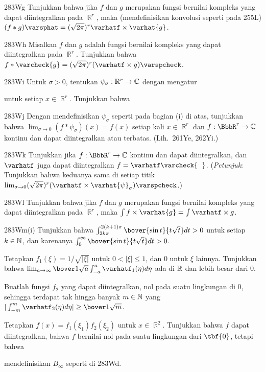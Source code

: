{\spheader 283Wg
Tunjukkan bahwa jika $f$ dan $g$ merupakan fungsi bernilai kompleks
yang dapat diintegralkan pada $\BbbR^r$, maka (mendefinisikan konvolusi seperti pada
255L) $(f*g)\varsphat=(\sqrt{2\pi})^r\varhatf\times\varhat{g}$.

\spheader 283Wh Misalkan $f$ dan $g$ adalah fungsi bernilai kompleks yang dapat
diintegralkan pada $\BbbR^r$. Tunjukkan bahwa
$f*\varcheck{g}=(\sqrt{2\pi})^r(\varhatf\times g)\varspcheck$.

\spheader 283Wi Untuk $\sigma>0$, tentukan
$\psi_{\sigma}:\Bbb R^r\to\Bbb C$ dengan mengatur


\noindent untuk setiap $x\in\BbbR^r$.   Tunjukkan bahwa


\spheader 283Wj Dengan mendefinisikan $\psi_{\sigma}$ seperti pada bagian (i) di atas, tunjukkan bahwa
$\lim_{\sigma\to 0}(f*\psi_{\sigma})(x)=f(x)$ setiap kali $x\in\BbbR^r$ dan
$f:\BbbR^r\to\Bbb C$ kontinu dan dapat diintegralkan atau terbatas.
(Lih.\ 261Ye, 262Yi.)

\spheader 283Wk Tunjukkan jika $f:\BbbR^r\to\Bbb C$ kontinu
dan dapat diintegralkan, dan $\varhatf$ juga dapat diintegralkan
$f=\varhatf\varcheck{\phantom{f}}$.
({\it Petunjuk\/}: Tunjukkan bahwa keduanya sama di setiap titik
$\lim_{\sigma\to 0}(\sqrt{2\pi})^r
  (\varhatf\times\varhat{\psi}_{\sigma})\varspcheck$.)

\spheader 283Wl Tunjukkan bahwa jika $f$ dan $g$ merupakan fungsi bernilai kompleks
yang dapat diintegralkan pada $\BbbR^r$, maka $\int
f\times\varhat{g}=\int\varhatf\times g$.

\spheader 283Wm(i) Tunjukkan bahwa
$\int_{2k\pi}^{2(k+1)\pi}\bover{\sin t}{t\sqrt{t}}dt>0$ untuk setiap
$k\in\Bbb N$, dan karenanya
$\int_0^{\infty}\bover{\sin t}{t\sqrt{t}}dt>0$.

 Tetapkan $f_1(\xi)=1/\sqrt{|\xi|}$ untuk $0<|\xi|\le 1$, dan $0$ untuk
 $\xi$ lainnya.   Tunjukkan bahwa
$\lim_{a\to\infty}\bover1{\sqrt{a}}\int_{-a}^a\varhatf_1(\eta)d\eta$
ada di $\Bbb R$ dan lebih besar dari $0$.

 Buatlah fungsi $f_2$ yang dapat diintegralkan, nol pada suatu lingkungan
di $0$, sehingga terdapat tak hingga banyak $m\in\Bbb N$
yang $|\int_{-m}^m\varhatf_2(\eta)d\eta|\ge\bover1{\sqrt{m}}$.

 Tetapkan $f(x)=f_1(\xi_1)f_2(\xi_2)$ untuk $x\in\BbbR^2$.
Tunjukkan bahwa $f$ dapat diintegralkan, bahwa $f$ bernilai nol pada suatu
lingkungan dari $\tbf{0}$, tetapi bahwa


\noindent mendefinisikan $B_{\infty}$ seperti di 283Wd.
}%

